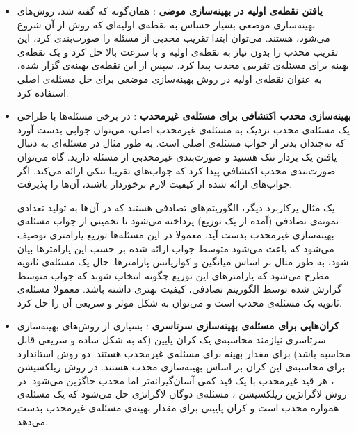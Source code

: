\begin{itemize}
\item \textbf{
یافتن نقطه‌ی اولیه در بهینه‌سازی موضی
}: 
همان‌گونه که گفته شد، روش‌های بهینه‌سازی موضعی بسیار حساس به نقطه‌ی اولیه‌ای که روش از آن شروع می‌شود، هستند. می‌توان ابتدا تقریب محدبی از مسئله را صورت‌بندی کرد، این تقریب محدب را بدون نیاز به نقطه‌ی اولیه و با سرعت بالا حل کرد و یک نقطه‌ی بهینه برای مسئله‌ی تقریبی محدب پیدا کرد. سپس از این نقطه‌ی بهینه‌ی گزار شده، به عنوان نقطه‌ی اولیه در روش بهینه‌سازی موضعی برای حل مسئله‌ی اصلی استفاده کرد. 

\item \textbf{
بهینه‌سازی محدب اکتشافی
برای مسئله‌ی غیرمحدب
}: 
در برخی مسئله‌ها با طراحی یک مسئله‌ی محدب نزدیک به مسئله‌ی غیرمحدب اصلی، می‌توان جوابی بدست آورد که نه‌چندان بدتر از جواب مسئله‌ی اصلی است. به طور مثال در مسئله‌ای به دنبال یافتن یک بردار تنک
هستید و صورت‌بندی غیرمحدبی از مسئله دارید. گاه می‌توان صورت‌بندی محدب اکتشافی پیدا کرد که جواب‌های تقریبا تنکی ارائه می‌کند. اگر جواب‌های ارائه شده از کیفیت لازم برخوردار باشند، آن‌ها را پذیرفت.

یک مثال پرکاربرد دیگر، الگوریتم‌های تصادفی
هستند که در آن‌ها به تولید تعدادی نمونه‌ی تصادفی (آمده از یک توزیع) پرداخته می‌شود تا تخمینی از جواب مسئله‌ی بهینه‌سازی غیرمحدب بدست آید. معمولا در این مسئله‌ها توزیع پارامتری توصیف می‌شود که باعث می‌شود متوسط جواب ارائه شده بر حسب این پارامترها بیان شود، به طور مثال بر اساس میانگین و کواریانس
پارامترها. حال یک مسئله‌ی ثانویه مطرح می‌شود که پارامترهای این توزیع چگونه انتخاب شوند که جواب متوسط گزارش شده توسط الگوریتم تصادفی، کیفیت بهتری داشته باشد. معمولا مسئله‌ی ثانویه یک مسئله‌ی محدب است و می‌توان به شکل موثر و سریعی آن را حل کرد.

\item\textbf{
کران‌هایی برای مسئله‌ی بهینه‌سازی سرتاسری
}: 
بسیاری از روش‌های بهینه‌سازی سرتاسری نیازمند محاسبه‌ی یک کران پایین (که به شکل ساده و سریعی قابل محاسبه باشد) برای مقدار بهینه برای مسئله‌ی غیرمحدب هستند. دو روش استاندارد برای محاسبه‌ی این کران بر اساس بهینه‌سازی محدب هستند. در روش ریلکسیشن
، 
هر قید غیرمحدب با یک قید کمی آسان‌گیرانه‌تر اما محدب جاگزین می‌شود. در روش لاگرانژین ریلکسیشن
، 
مسئله‌ی دوگان لاگرانژی
حل می‌شود که یک مسئله‌ی همواره محدب است و کران پایینی برای مقدار بهینه‌ی مسئله‌ی غیرمحدب بدست می‌دهد.


\end{itemize}



































